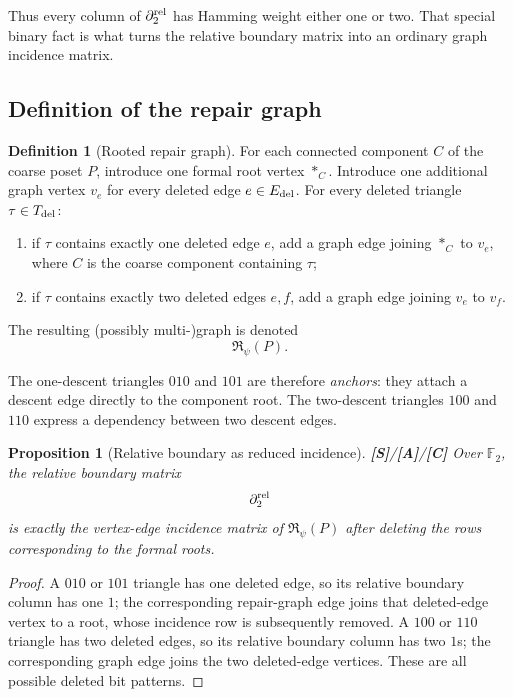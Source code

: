 \documentclass[11pt]{article}
\newtheorem{proposition}[theorem]{Proposition}
\theoremstyle{definition}
\newtheorem{definition}[theorem]{Definition}
\newcommand{\F}{\mathbb F_2}
\newcommand{\statusS}{\textbf{[S]}}
\newcommand{\statusA}{\textbf{[A]}}
\newcommand{\statusC}{\textbf{[C]}}
\begin{document}
Thus every column of $\partial_2^{\rm rel}$ has Hamming weight either one or two. That special binary fact is what turns the relative boundary matrix into an ordinary graph incidence matrix.

\subsection{Definition of the repair graph}

\begin{definition}[Rooted repair graph]\label{def:repairgraph}
For each connected component $C$ of the coarse poset $P$, introduce one formal root vertex $*_C$. Introduce one additional graph vertex $v_e$ for every deleted edge $e\in E_{\rm del}$. For every deleted triangle $\tau\in T_{\rm del}$:
\begin{enumerate}[label=(\roman*)]
\item if $\tau$ contains exactly one deleted edge $e$, add a graph edge joining $*_C$ to $v_e$, where $C$ is the coarse component containing $\tau$;
\item if $\tau$ contains exactly two deleted edges $e,f$, add a graph edge joining $v_e$ to $v_f$.
\end{enumerate}
The resulting (possibly multi-)graph is denoted
\[
\mathfrak R_\psi(P).
\]
\end{definition}

The one-descent triangles $010$ and $101$ are therefore \emph{anchors}: they attach a descent edge directly to the component root. The two-descent triangles $100$ and $110$ express a dependency between two descent edges.

\begin{proposition}[Relative boundary as reduced incidence]\label{prop:incidence}
\statusS/\statusA/\statusC\;
Over $\F$, the relative boundary matrix
\[
\partial_2^{\rm rel}
\]
is exactly the vertex-edge incidence matrix of $\mathfrak R_\psi(P)$ after deleting the rows corresponding to the formal roots.
\end{proposition}

\begin{proof}
A $010$ or $101$ triangle has one deleted edge, so its relative boundary column has one $1$; the corresponding repair-graph edge joins that deleted-edge vertex to a root, whose incidence row is subsequently removed. A $100$ or $110$ triangle has two deleted edges, so its relative boundary column has two $1$s; the corresponding graph edge joins the two deleted-edge vertices. These are all possible deleted bit patterns.
\end{proof}
\end{document}
